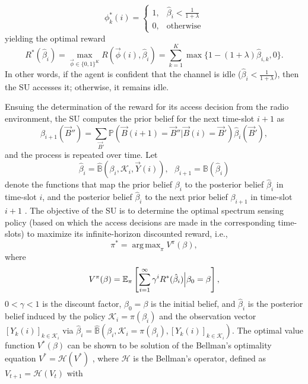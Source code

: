 \documentclass[12pt, draftcls, onecolumn]{IEEEtran}
\DeclareMathOperator*{\argmax}{arg\,max}
\begin{document}
\begin{equation}
    \phi_{k}^{*}(i) = \left\{
        \begin{array}{cc}
             1, &  \hat{\beta}_{i}{<}\frac{1}{1{+}\lambda}\\
             0, &  \text{otherwise}
        \end{array}\right.
\end{equation}
yielding the optimal reward
$$
R^*(\hat{\beta}_{i})=\max_{\vec{\phi}\in\{0,1\}^K} R(\vec{\phi}(i),\hat{\beta}_{i})
=
\sum_{k=1}^{K}\max\{1-(1+\lambda)\hat{\beta}_{i,k},0\}.
$$
In other words, if the agent is confident that the channel is idle ($\hat{\beta}_{i}{<}\frac{1}{1{+}\lambda}$), then the SU accesses it; otherwise, it remains idle.

Ensuing the determination of the reward for its access decision from the radio environment, the SU computes the prior belief for the next time-slot $i+1$ as
\begin{equation}\label{13}
    \beta_{i+1}(\vec{B}'')=\sum_{\vec{B}'}\mathbb{P}(\vec{B}(i+1)=\vec{B}''|\vec{B}(i)=\vec{B}')\hat{\beta}_i(\vec{B}'),
\end{equation}
and the process is repeated over time.
Let
\begin{equation}\label{14}
    \hat{\beta}_{i}=\hat{\mathbb{B}}(\beta_{i},\mathcal{K}_{i},\vec{Y}(i)),\ \ \ \beta_{i+1}=\mathbb{B}(\hat{\beta}_{i})
\end{equation}
denote the functions that map the prior belief $\beta_{i}$ to the posterior belief $\hat{\beta}_{i}$ in time-slot $i$, and the posterior belief $\hat{\beta}_{i}$ to the next prior belief $\beta_{i+1}$ in time-slot $i+1$ . The objective of the SU is to determine the optimal spectrum sensing policy (based on which the access decisions are made in the corresponding time-slots) to maximize its infinite-horizon discounted reward, i.e.,
\begin{equation}\label{16}
    \pi^{*}=\argmax_{\pi}V^{\pi}(\beta),
\end{equation}
where
\begin{equation}\label{17}
    V^{\pi}(\beta)=\mathbb{E}_{\pi}\left[\sum_{i=1}^{\infty}\gamma^{i}
    R^*(\hat{\beta}_{i})\Big{|}\beta_{0}=\beta\right],
\end{equation}
 $0{<}\gamma{<}1$ is the discount factor, $\beta_{0}{=}\beta$ is the initial belief, and $\hat{\beta}_{i}$ is the posterior belief induced by the policy $\mathcal{K}_{i}{=}\pi(\beta_{i})$ and the observation vector $[Y_{k}(i)]_{k{\in}\mathcal{K}_{i}}$ via $\hat{\beta}_{i} = \hat{\mathbb{B}}(\beta_{i}, \mathcal{K}_{i} = \pi(\beta_{i}), [Y_{k}(i)]_{k \in \mathcal{K}_{i}})$. The optimal value function $V^*(\beta)$ can be shown to be solution of the Bellman's optimality equation $V^{*}{=}\mathcal{H}(V^{*})$ \cite{PUOccupancy:18}, where $\mathcal H$ is the Bellman's operator, defined as $V_{t+1}{=}\mathcal{H}(V_t)$ with
\end{document}
